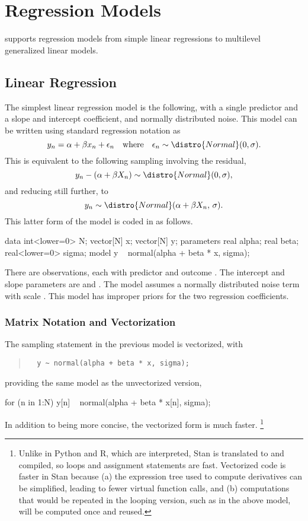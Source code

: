 \chapter{Regression Models}

\noindent
\Stan supports regression models from simple linear regressions to
multilevel generalized linear models.  

\section{Linear Regression}

The simplest linear regression model is the following, with a single
predictor and a slope and intercept coefficient, and normally
distributed noise.  This model can be written using standard
regression notation as
%
\[
y_n = \alpha + \beta x_n + \epsilon_n
\ \ \ \mbox{where} \ \ \ 
\epsilon_n \sim \distro{Normal}(0,\sigma).
\]
This is equivalent to the following sampling involving the
residual,
\[
y_n - (\alpha + \beta X_n) \sim \distro{Normal}(0,\sigma),
\]
and reducing still further, to
\[
y_n \sim \distro{Normal}(\alpha + \beta X_n, \, \sigma).
\]
%
This latter form of the model is coded in \Stan as follows.
%
\begin{stancode}
data {
  int<lower=0> N;
  vector[N] x;
  vector[N] y;
}
parameters {
  real alpha;
  real beta;
  real<lower=0> sigma;
}
model {
  y ~ normal(alpha + beta * x, sigma);
}
\end{stancode}
%
There are  observations, each with predictor  and
outcome \code{y[n]}.  The intercept and slope parameters are
 and .  The model assumes a normally
distributed noise term with scale .  This model has
improper priors for the two regression coefficients.

\subsection{Matrix Notation and Vectorization}

The sampling statement in the previous model is vectorized, with
%
\begin{quote}
\begin{Verbatim}
  y ~ normal(alpha + beta * x, sigma);
\end{Verbatim}
\end{quote}
%
providing the same model as the unvectorized version,
%
\begin{stancode}
  for (n in 1:N)
    y[n] ~ normal(alpha + beta * x[n], sigma);
\end{stancode}
%
In addition to being more concise, the vectorized form is much faster.%
%
\footnote{Unlike in Python and R, which are interpreted, Stan is
  translated to \Cpp and compiled, so loops and assignment statements
  are fast.  Vectorized code is faster in Stan because (a) the
  expression tree used to compute derivatives can be simplified,
  leading to fewer virtual function calls, and (b) computations that
  would be repeated in the looping version, such as \code{log(sigma)}
  in the above model, will be computed once and reused.}

